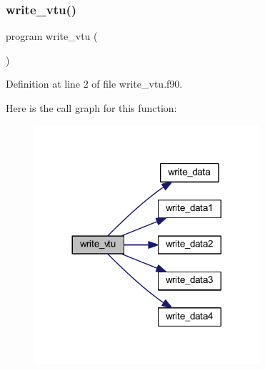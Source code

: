 \subsubsection{\texorpdfstring{write\+\_\+vtu()}{write\_vtu()}}
{\footnotesize\ttfamily program write\+\_\+vtu (\begin{DoxyParamCaption}{ }\end{DoxyParamCaption})}



Definition at line 2 of file write\+\_\+vtu.\+f90.

Here is the call graph for this function\+:
\nopagebreak
\begin{figure}[H]
\begin{center}
\leavevmode
\includegraphics[width=236pt]{write__vtu_8f90_a8bbc7ab4725ee50b236ba1ffab6f3b88_cgraph}
\end{center}
\end{figure}
